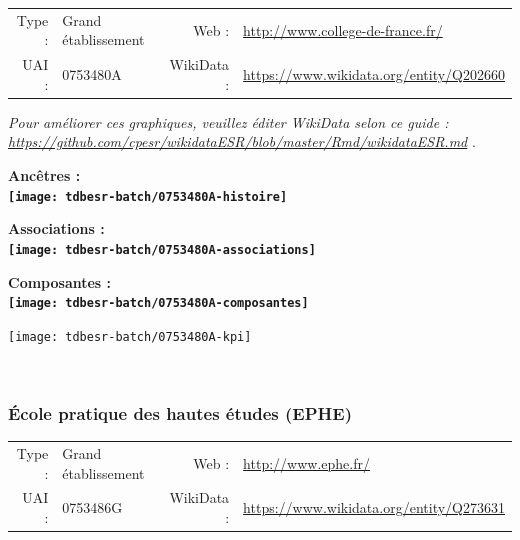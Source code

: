 \documentclass[12pt,french,]{article}
\begin{document}
\begin{tabular*}{\textwidth}{rp{5cm}rl}  
\hline  
Type : & Grand établissement & Web : &\href{http://www.college-de-france.fr/}{http://www.college-de-france.fr/} \\  
UAI : & 0753480A & WikiData : & \href{https://www.wikidata.org/entity/Q202660}{https://www.wikidata.org/entity/Q202660} \\  
\hline  
\end{tabular*}

\textit{\scriptsize Pour améliorer ces graphiques, veuillez éditer WikiData selon ce guide :  \href{https://github.com/cpesr/wikidataESR/blob/master/Rmd/wikidataESR.md}{https://github.com/cpesr/wikidataESR/blob/master/Rmd/wikidataESR.md}}
.

\vspace{1cm}  
\begin{minipage}[b]{0.50\textwidth}\begin{center} \bf Ancêtres : \\  
\texttt{[image: tdbesr-batch/0753480A-histoire]} \end{center}\end{minipage}\begin{minipage}[b]{0.50\textwidth}\begin{center} \bf Associations : \\  
\texttt{[image: tdbesr-batch/0753480A-associations]} \end{center}\end{minipage}

\hrulefill

\begin{center} \bf Composantes : \\  
\texttt{[image: tdbesr-batch/0753480A-composantes]} \end{center}

\begin{center}\texttt{[image: tdbesr-batch/0753480A-kpi]} \end{center}\checkoddpage

\ifoddpage \fi ~\newpage  

\hypertarget{uxe9cole-pratique-des-hautes-uxe9tudes-ephe}{%
\subsubsection{École pratique des hautes études
(EPHE)}\label{uxe9cole-pratique-des-hautes-uxe9tudes-ephe}}

\begin{tabular*}{\textwidth}{rp{5cm}rl}  
\hline  
Type : & Grand établissement & Web : &\href{http://www.ephe.fr/}{http://www.ephe.fr/} \\  
UAI : & 0753486G & WikiData : & \href{https://www.wikidata.org/entity/Q273631}{https://www.wikidata.org/entity/Q273631} \\  
\hline  
\end{tabular*}
\end{document}
